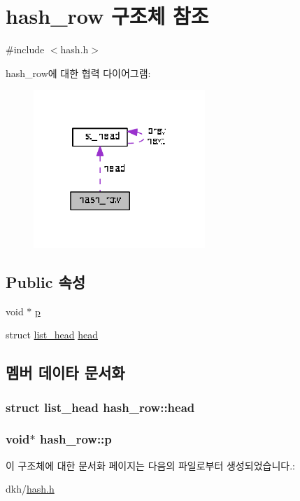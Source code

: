\hypertarget{structhash__row}{\section{hash\+\_\+row 구조체 참조}
\label{structhash__row}
}


{\ttfamily \#include $<$hash.\+h$>$}



hash\+\_\+row에 대한 협력 다이어그램\+:
\nopagebreak
\begin{figure}[H]
\begin{center}
\leavevmode
\includegraphics[width=184pt]{structhash__row__coll__graph}
\end{center}
\end{figure}
\subsection*{Public 속성}
\begin{DoxyCompactItemize}
\item 
void $\ast$ \hyperlink{structhash__row_a270cca5040fb8c27a8b5595cc921d960}{p}
\item 
struct \hyperlink{structlist__head}{list\+\_\+head} \hyperlink{structhash__row_aeef0a2f42e9fa516efe336bba7a990d4}{head}
\end{DoxyCompactItemize}


\subsection{멤버 데이타 문서화}
\hypertarget{structhash__row_aeef0a2f42e9fa516efe336bba7a990d4}{
\subsubsection[{head}]{\setlength{\rightskip}{0pt plus 5cm}struct {\bf list\+\_\+head} hash\+\_\+row\+::head}}\label{structhash__row_aeef0a2f42e9fa516efe336bba7a990d4}
\hypertarget{structhash__row_a270cca5040fb8c27a8b5595cc921d960}{
\subsubsection[{p}]{\setlength{\rightskip}{0pt plus 5cm}void$\ast$ hash\+\_\+row\+::p}}\label{structhash__row_a270cca5040fb8c27a8b5595cc921d960}


이 구조체에 대한 문서화 페이지는 다음의 파일로부터 생성되었습니다.\+:\begin{DoxyCompactItemize}
\item 
dkh/\hyperlink{hash_8h}{hash.\+h}\end{DoxyCompactItemize}
